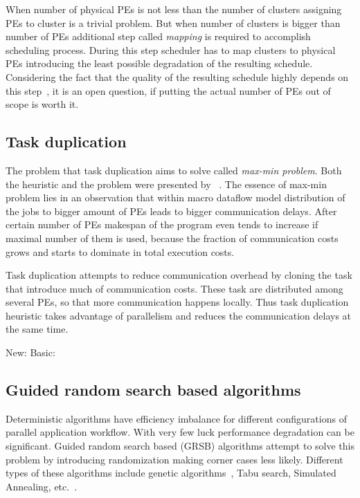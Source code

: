 When number of physical PEs is not less than the number of clusters
assigning PEs to cluster is a trivial problem. But when number of
clusters is bigger than number of PEs additional step called
\emph{mapping} is required to accomplish scheduling process. During
this step scheduler has to map clusters to physical PEs introducing
the least possible degradation of the resulting schedule. Considering
the fact that the quality of the resulting schedule highly depends on
this step~\cite{kwok1999static}, it is an open question,
if putting the actual number of PEs out of scope is worth it.

\subsection{Task duplication}
\label{sec:duplication}

The problem that task duplication aims to solve called \emph{max-min
  problem}. Both the heuristic and the problem were presented by
\citeauthor{kruatrachue1987static}~\cite{kruatrachue1987static}. The
essence of max-min problem lies in an observation that within macro
dataflow model distribution of the jobs to bigger amount of PEs leads
to bigger communication delays. After certain number of PEs makespan
of the program even tends to increase if maximal number of them is
used, because the fraction of communication costs grows and starts to
dominate in total execution costs.

Task duplication attempts to reduce communication overhead by cloning
the task that introduce much of communication costs. These task are
distributed among several PEs, so that more communication happens
locally. Thus task duplication heuristic takes advantage of
parallelism and reduces the communication delays at the same time.

New: \cite{shin2008task} Basic: \cite{ahmad1994new} 

\subsection{Guided random search based algorithms}
\label{sec:random}

Deterministic algorithms have efficiency imbalance for different
configurations of parallel application workflow. With very few luck
performance degradation can be significant. Guided random search based
(GRSB) algorithms attempt to solve this problem by introducing
randomization making corner cases less likely. Different types of
these algorithms include genetic
algorithms~\cite{grajcar1999genetic, aggarwal2005, wang2009,
  kolodziej2013}, Tabu search, Simulated Annealing,
etc.~\cite{braun2001comparison}.

